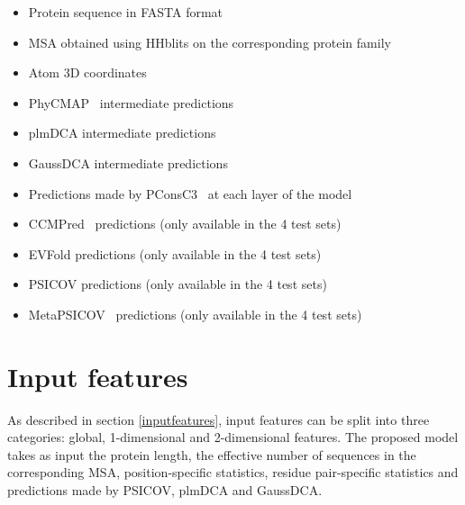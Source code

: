 
  \begin{itemize}
    \item Protein sequence in FASTA format
    \item MSA obtained using HHblits on the corresponding protein family
    \item Atom 3D coordinates
    \item PhyCMAP~\cite{PhyCMap} intermediate predictions
    \item plmDCA intermediate predictions
    \item GaussDCA intermediate predictions
    \item Predictions made by PConsC3~\cite{Skwark079673} at each layer of the model
    \item CCMPred~\cite{CCMPred} predictions (only available in the 4 test sets)
    \item EVFold predictions (only available in the 4 test sets)
    \item PSICOV predictions (only available in the 4 test sets)
    \item MetaPSICOV~\cite{MetaPSICOV} predictions (only available in the 4 test sets)
  \end{itemize}



\section{Input features}

  As described in section \ref{inputfeatures}, input features can be split into three categories:
  global, 1-dimensional and 2-dimensional features.
  The proposed model takes as input the protein length, the effective number of sequences 
  in the corresponding MSA, position-specific statistics, residue pair-specific statistics
  and predictions made by PSICOV, plmDCA and GaussDCA.

